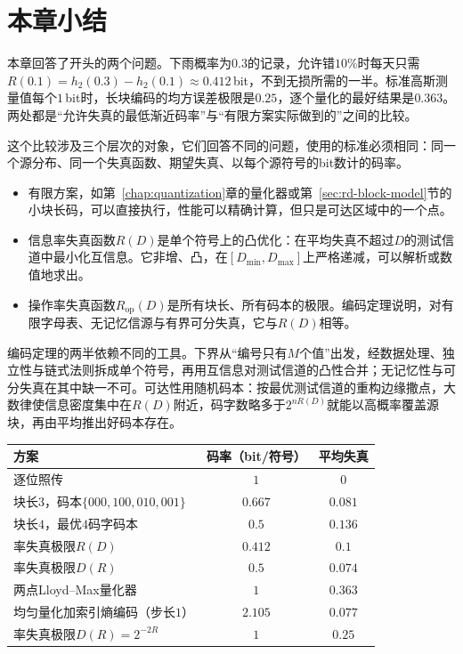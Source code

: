 \section{本章小结}
\label{sec:rd-summary}

本章回答了开头的两个问题。下雨概率为$0.3$的记录，允许错$10\%$时每天只需$R(0.1)=h_2(0.3)-h_2(0.1)\approx0.412$\,bit，不到无损所需的一半。标准高斯测量值每个$1$\,bit时，长块编码的均方误差极限是$0.25$，逐个量化的最好结果是$0.363$。两处都是“允许失真的最低渐近码率”与“有限方案实际做到的”之间的比较。

这个比较涉及三个层次的对象，它们回答不同的问题，使用的标准必须相同：同一个源分布、同一个失真函数、期望失真、以每个源符号的bit数计的码率。
\begin{itemize}
  \item 有限方案，如第~\ref{chap:quantization}章的量化器或第~\ref{sec:rd-block-model}节的小块长码，可以直接执行，性能可以精确计算，但只是可达区域中的一个点。
  \item 信息率失真函数$R(D)$是单个符号上的凸优化：在平均失真不超过$D$的测试信道中最小化互信息。它非增、凸，在$[D_{\min},D_{\max}]$上严格递减，可以解析或数值地求出。
  \item 操作率失真函数$R_{\mathrm{op}}(D)$是所有块长、所有码本的极限。编码定理说明，对有限字母表、无记忆信源与有界可分失真，它与$R(D)$相等。
\end{itemize}

编码定理的两半依赖不同的工具。下界从“编号只有$M$个值”出发，经数据处理、独立性与链式法则拆成单个符号，再用互信息对测试信道的凸性合并；无记忆性与可分失真在其中缺一不可。可达性用随机码本：按最优测试信道的重构边缘撒点，大数律使信息密度集中在$R(D)$附近，码字数略多于$2^{nR(D)}$就能以高概率覆盖源块，再由平均推出好码本存在。

\begin{BookInlineTable}
  \centering
  \caption{贯穿例子中几类方案的比较。上半部分为$\operatorname{Bern}(0.3)$信源与Hamming失真，下半部分为标准高斯信源与平方失真。}
  \label{tab:rd-summary}
  \begin{tabular}{lcc}
    \toprule
    方案 & 码率（bit/符号） & 平均失真 \\
    \midrule
    逐位照传 & $1$ & $0$ \\
    块长$3$，码本$\{000,100,010,001\}$ & $0.667$ & $0.081$ \\
    块长$4$，最优$4$码字码本 & $0.5$ & $0.136$ \\
    率失真极限$R(D)$ & $0.412$ & $0.1$ \\
    率失真极限$D(R)$ & $0.5$ & $0.074$ \\
    \midrule
    两点Lloyd–Max量化器 & $1$ & $0.363$ \\
    均匀量化加索引熵编码（步长$1$） & $2.105$ & $0.077$ \\
    率失真极限$D(R)=2^{-2R}$ & $1$ & $0.25$ \\
    \bottomrule
  \end{tabular}
\end{BookInlineTable}

